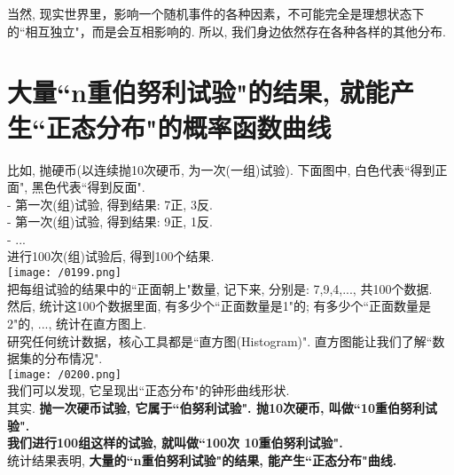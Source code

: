 \documentclass[UTF8]{ctexart}
\begin{document}
	当然, 现实世界里，影响一个随机事件的各种因素，不可能完全是理想状态下的``相互独立"，而是会互相影响的. 所以, 我们身边依然存在各种各样的其他分布. \\
	
	
	
	
	
	\section{大量``n重伯努利试验"的结果, 就能产生``正态分布"的概率函数曲线}
	
	\begin{myEnvSample}
		比如, 抛硬币(以连续抛10次硬币, 为一次(一组)试验). 下面图中, 白色代表``得到正面", 黑色代表``得到反面". \\
		- 第一次(组)试验, 得到结果: 7正, 3反. \\
		- 第一次(组)试验, 得到结果: 9正, 1反. \\
		- ... \\
		
		进行100次(组)试验后,  得到100个结果. \\
		
		\texttt{[image: /0199.png]} \\
		
		把每组试验的结果中的``正面朝上"数量, 记下来, 分别是: 7,9,4,..., 共100个数据. \\
		然后, 统计这100个数据里面, 有多少个``正面数量是1"的; 有多少个``正面数量是2"的, ..., 统计在直方图上. \\
		
		研究任何统计数据，核心工具都是``直方图(Histogram)". 直方图能让我们了解``数据集的分布情况". \\
		
		\texttt{[image: /0200.png]} \\
		
		我们可以发现, 它呈现出``正态分布"的钟形曲线形状. \\
		
		其实. \textbf{抛一次硬币试验, 它属于``伯努利试验". 抛10次硬币, 叫做``10重伯努利试验".} \\
		\textbf{我们进行100组这样的试验, 就叫做``100次 10重伯努利试验".} \\
		统计结果表明, \textbf{大量的``n重伯努利试验"的结果, 能产生``正态分布"曲线.} 	
	\end{myEnvSample}
	\vspace{1em} 
	
	
	
\end{document}
